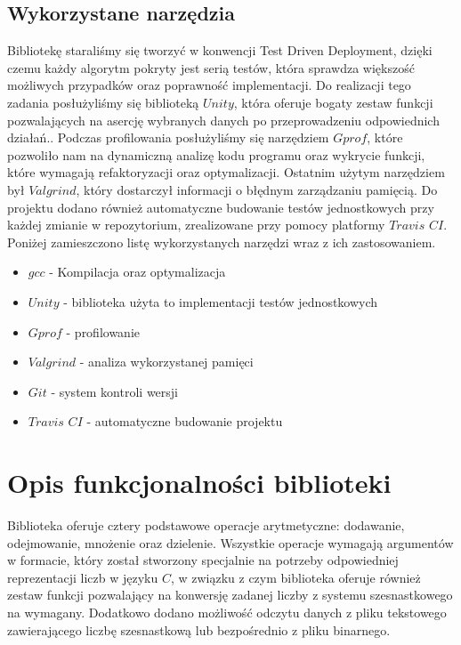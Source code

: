 \documentclass{article}
\begin{document}
\subsection{Wykorzystane narzędzia}

Bibliotekę staraliśmy się tworzyć w konwencji Test Driven Deployment, dzięki czemu każdy algorytm pokryty jest serią testów, która sprawdza większość możliwych przypadków oraz poprawność implementacji. Do realizacji tego zadania posłużyliśmy się biblioteką $Unity$, która oferuje bogaty zestaw funkcji pozwalających na asercję wybranych danych po przeprowadzeniu odpowiednich działań.. Podczas profilowania posłużyliśmy się narzędziem $Gprof$, które pozwoliło nam na dynamiczną analizę kodu programu oraz wykrycie funkcji, które wymagają refaktoryzacji oraz optymalizacji. Ostatnim użytym narzędziem był $Valgrind$, który dostarczył informacji o błędnym zarządzaniu pamięcią.  Do projektu dodano również automatyczne budowanie testów jednostkowych przy każdej zmianie w repozytorium, zrealizowane przy pomocy platformy $Travis$ $CI$. Poniżej zamieszczono listę wykorzystanych narzędzi wraz z ich zastosowaniem.

\clearpage

\begin{itemize}
    \itemsep0em 
    \item $gcc$ - Kompilacja oraz optymalizacja
    \item $Unity$ - biblioteka użyta to implementacji testów jednostkowych
    \item $Gprof$ - profilowanie
    \item $Valgrind$ - analiza wykorzystanej pamięci
    \item $Git$ - system kontroli wersji
    \item $Travis$ $CI$ - automatyczne budowanie projektu
\end{itemize}

\section{Opis funkcjonalności biblioteki}

Biblioteka oferuje cztery podstawowe operacje arytmetyczne: dodawanie, odejmowanie, mnożenie oraz dzielenie. Wszystkie operacje wymagają argumentów w formacie, który został stworzony specjalnie na potrzeby odpowiedniej reprezentacji liczb w języku $C$, w związku z czym biblioteka oferuje również zestaw funkcji pozwalający na konwersję zadanej liczby z systemu szesnastkowego na wymagany. Dodatkowo dodano możliwość odczytu danych z pliku tekstowego zawierającego liczbę szesnastkową lub bezpośrednio z pliku binarnego.
\end{document}

